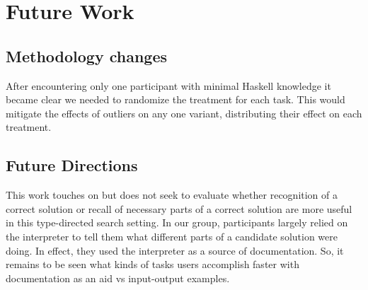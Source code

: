 \section{Future Work}
\label{sec:future}

\subsection{Methodology changes}
After encountering only one participant with minimal Haskell knowledge it became
clear we needed to randomize the treatment for each task.
%
This would mitigate the effects of outliers on any one variant, distributing
their effect on each treatment.
%

\subsection{Future Directions}
This work touches on but does not seek to evaluate whether recognition of a
correct solution or recall of necessary parts of a correct solution are more
useful in this type-directed search setting.
%
In our \noexamples group, participants largely relied on the interpreter to tell
them what different parts of a candidate solution were doing.
%
In effect, they used the interpreter as a source of documentation.
%
So, it remains to be seen what kinds of tasks users accomplish faster with
documentation as an aid vs input-output examples.
%

